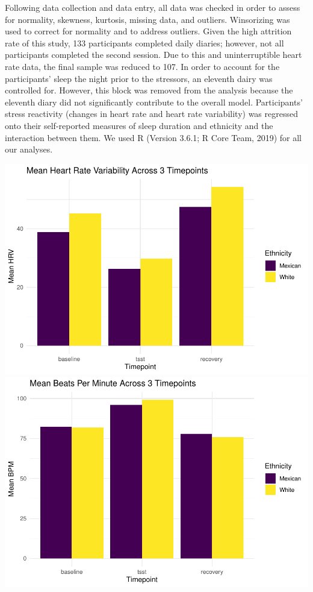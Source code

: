 \documentclass[man, fleqn, noextraspace]{apa6}
\begin{document}
Following data collection and data entry, all data was checked in order to assess for normality, skewness, kurtosis, missing data, and outliers. Winsorizing was used to correct for normality and to address outliers. Given the high attrition rate of this study, 133 participants completed daily diaries; however, not all participants completed the second session. Due to this and uninterruptible heart rate data, the final sample was reduced to 107. In order to account for the participants' sleep the night prior to the stressors, an eleventh dairy was controlled for. However, this block was removed from the analysis because the eleventh diary did not significantly contribute to the overall model. Participants' stress reactivity (changes in heart rate and heart rate variability) was regressed onto their self-reported measures of sleep duration and ethnicity and the interaction between them. We used R (Version 3.6.1; R Core Team, 2019) for all our analyses.

\includegraphics{PAPAJA_Final_class_project_files/figure-latex/visualization-1.pdf} \includegraphics{PAPAJA_Final_class_project_files/figure-latex/visualization-2.pdf}
\end{document}
